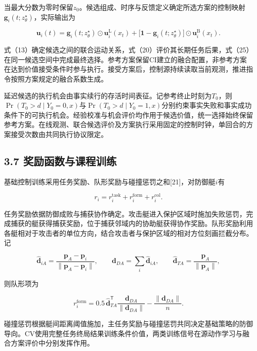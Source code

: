 \documentclass[
  11pt,
  fontset=none]{ctexart}
\begin{document}
当最大分数为零时保留\(z_0\)。候选组成、时序与反馈定义确定所选方案的控制映射\(\boldsymbol g_i(t;z_\theta^\star)\)，实际输出为

\[
\boldsymbol u_i(t)=
\boldsymbol g_i(t;z_\theta^\star)\odot\boldsymbol u_i^{\mathrm L}(x_t)
+\bigl[\boldsymbol 1-\boldsymbol g_i(t;z_\theta^\star)\bigr]
\odot\boldsymbol u_i^{\mathrm B}(x_t) .
\tag{26}
\]

式（13）确定候选之间的联合运动关系，式（20）评价其长期任务后果，式（25）在同一候选空间中完成最终选择。参考方案保留CI建立的融合配置，非参考方案在达到价值接受条件时参与执行。接受方案后，控制源持续读取当前观测，推进指令按照方案规定的融合系数生成。

延迟候选的执行机会由事实续行的存活时间表征。记参考终止时刻为\(T_0\)，则\(\Pr(T_0>d\mid Y_0=0,x)\)与\(\Pr(T_0>d\mid Y_0=1,x)\)分别约束事实失败和事实成功条件下的可执行机会。经验校准与机会评价均作用于候选价值，统一选择始终保留参考方案。在线观测、联合候选评价及方案执行采用固定的控制时钟，单回合的方案接受次数由共同执行协议限定。

\subsection{3.7
奖励函数与课程训练}\label{ux5956ux52b1ux51fdux6570ux4e0eux8bfeux7a0bux8badux7ec3}

基础控制训练采用任务奖励、队形奖励与碰撞惩罚之和{[}21{]}，对防御艇\(i\)有

\[
r_i=r_i^{\mathrm{task}}+r_i^{\mathrm{form}}+r_i^{\mathrm{col}} .
\tag{27}
\]

任务奖励依据防御成败与捕获协作确定。攻击艇进入保护区域时施加失败惩罚，完成捕获的艇获得捕获奖励，位于捕获邻域内的协助艇获得协作奖励。队形奖励利用各艇相对于攻击者的单位方向，结合攻击者与保护区域的相对方位刻画拦截分布。记

\[
\widehat{\boldsymbol d}_{iA}
=\frac{\boldsymbol p_A-\boldsymbol p_i}
{\|\boldsymbol p_A-\boldsymbol p_i\|},
\qquad
\boldsymbol d_{DA}=\sum_i\widehat{\boldsymbol d}_{iA},
\qquad
\widehat{\boldsymbol d}_{TA}
=\frac{\boldsymbol p_A}{\|\boldsymbol p_A\|},
\tag{28}
\]

则队形项为

\[
r_i^{\mathrm{form}}
=0.5\,\widehat{\boldsymbol d}_{TA}^{\mathsf T}
\frac{\boldsymbol d_{DA}}{\|\boldsymbol d_{DA}\|}
-\frac{\|\boldsymbol d_{DA}\|}{n} .
\tag{29}
\]

碰撞惩罚根据艇间距离阈值施加，主任务奖励与碰撞惩罚共同决定基础策略的防御导向。CV使用完整任务终局结果训练条件价值，两类训练信号在源动作学习与融合方案评价中分别发挥作用。
\end{document}
